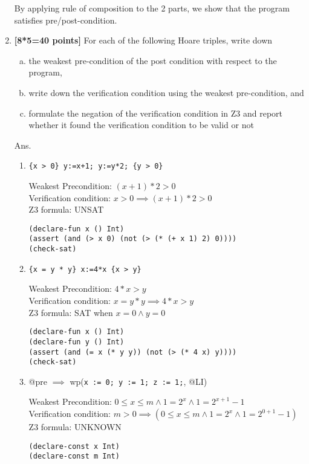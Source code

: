 \documentclass{article}
\begin{document}
\begin{enumerate}
By applying rule of composition to the 2 parts, we show that the program satisfies pre/post-condition.

\item \textbf{[8*5=40 points]}
For each of the following Hoare triples, write down
\begin{enumerate}[(a)]
\item the weakest pre-condition of the post condition with respect to the program,
\item write down the verification condition using the weakest pre-condition, and
\item formulate the negation of the verification condition in Z3 and report whether it found the verification condition to be valid or not
\end{enumerate}

\medskip
Ans.
\medskip

\begin{enumerate}[(1)]
    \item \verb|{x > 0} y:=x+1; y:=y*2; {y > 0}|

        Weakest Precondition: $(x+1)*2 > 0$ \\
        Verification condition: $x > 0 \implies (x+1)*2 > 0$ \\
        Z3 formula: UNSAT
\begin{verbatim}
(declare-fun x () Int)
(assert (and (> x 0) (not (> (* (+ x 1) 2) 0))))
(check-sat)
\end{verbatim}
        
    \item \verb|{x = y * y} x:=4*x {x > y}|

        Weakest Precondition: $4*x > y$ \\
        Verification condition: $x = y*y \implies 4*x > y$ \\
        Z3 formula: SAT when $x=0 \land y=0$
\begin{verbatim}
(declare-fun x () Int)
(declare-fun y () Int)
(assert (and (= x (* y y)) (not (> (* 4 x) y))))
(check-sat)
\end{verbatim}

\item @pre $\implies$ wp(\verb|x := 0; y := 1; z := 1;|, @LI)

        Weakest Precondition: $0 \leq x \leq m \land 1 = 2^x \land 1 = 2^{x + 1} - 1$ \\
        Verification condition: $m > 0 \implies (0 \leq x \leq m \land 1 = 2^x \land 1 = 2^{0 + 1} - 1)$ \\
        Z3 formula: UNKNOWN
\begin{verbatim}
(declare-const x Int)
(declare-const m Int)


\end{verbatim}
\end{enumerate}
\end{enumerate}
\end{document}
